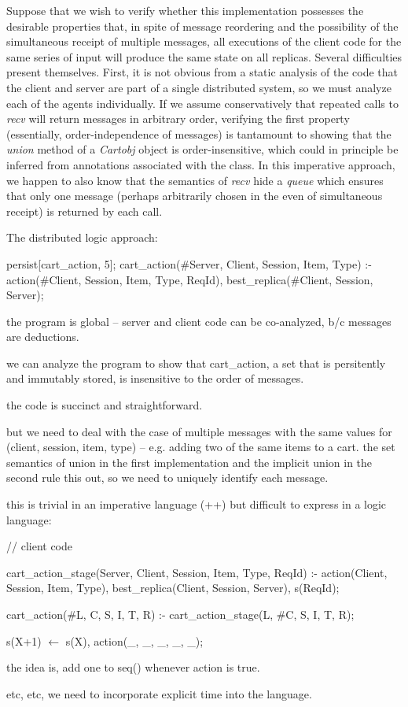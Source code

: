 Suppose that we wish to verify whether this implementation possesses the desirable 
properties that, in spite of message reordering and the possibility of the simultaneous
receipt of multiple messages, all executions of the client code for the same series of
input will produce the same state on all replicas.  Several difficulties present themselves.
First, it is not obvious from a static analysis of the code that the client and server are
part of a single distributed system, so we must analyze each of the agents individually.
If we assume conservatively that repeated calls to {\em recv} will return messages in
arbitrary order, verifying the first property (essentially, order-independence of messages)
is tantamount to showing that the {\em union} method of a {\em Cartobj} object is
order-insensitive, which could in principle be inferred from annotations associated
with the class.
In this imperative approach, we happen to also know that the semantics of {\em recv}
hide a {\em queue} which ensures that only one message (perhaps arbitrarily chosen in the
even of simultaneous receipt) is returned by each call.



The distributed logic approach:

\begin{Dedalus}
persist[cart_action, 5];
cart_action(#Server, Client, Session, Item, Type) :-
  action(#Client, Session, Item, Type, ReqId),
  best_replica(#Client, Session, Server);
\end{Dedalus}

the program is global -- server and client code can be co-analyzed, b/c messages are deductions.

we can analyze the program to show that cart\_action, a set that is persitently and immutably
stored, is insensitive to the order of messages.

the code is succinct and straightforward. 

but we need to deal with the case of multiple messages with the same values for
(client, session, item, type) -- e.g. adding two of the same items to a cart.  the set semantics
of union in the first implementation and the implicit union in the second rule this out,
so we need to uniquely identify each message.

this is trivial in an imperative language (++) but difficult to express in a logic language:

\begin{Dedalus}
// client code

cart_action_stage(Server, Client, Session, Item, Type, ReqId) :-
  action(Client, Session, Item, Type),
  best_replica(Client, Session, Server),
  s(ReqId);

cart_action(#L, C, S, I, T, R) :-
  cart_action_stage(L, #C, S, I, T, R);

s(X+1) \(\leftarrow\)  s(X), action(_, _, _, _, _);
\end{Dedalus}

the idea is, add one to seq() whenever action is true.

etc, etc, we need to incorporate explicit time into the language.
